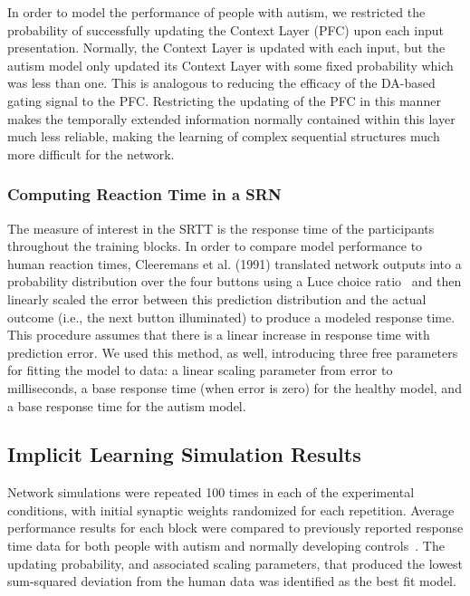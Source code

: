 In order to model the performance of people with autism, we restricted the probability of successfully updating the Context Layer (PFC) upon each input presentation.  Normally, the Context Layer is updated with each input, but the autism model only updated its Context Layer with some fixed probability which was less than one.  This is analogous to reducing the efficacy of the DA-based gating signal to the PFC.  Restricting the updating of the PFC in this manner makes the temporally extended information normally contained within this layer much less reliable, making the learning of complex sequential structures much more difficult for the network.

\subsubsection{Computing Reaction Time in a SRN}
The measure of interest in the SRTT is the response time of the participants throughout the training blocks.  In order to compare model performance to human reaction times, Cleeremans et al. (1991) \nocite{Cleeremans:1991:SSRT} translated network outputs into a probability distribution over the four buttons using a Luce choice ratio~\cite{Luce:1963} and then linearly scaled the error between this prediction distribution and the actual outcome (i.e., the next button illuminated) to produce a modeled response time.  This procedure assumes that there is a linear increase in response time with prediction error.  We used this method, as well, introducing three free parameters for fitting the model to data: a linear scaling parameter from error to milliseconds, a base response time (when error is zero) for the healthy model, and a base response time for the autism model.  

\subsection{Implicit Learning Simulation Results}
Network simulations were repeated 100 times in each of the experimental conditions, with initial synaptic weights randomized for each repetition.  Average performance results for each block were compared to previously reported response time data for both people with autism and normally developing controls~\cite{RefWorks:148}.  The updating probability, and associated scaling parameters, that produced the lowest sum-squared deviation from the human data was identified as the best fit model.

